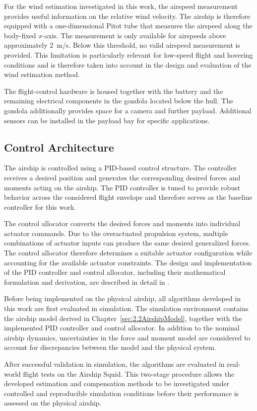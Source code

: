 For the wind estimation investigated in this work, the airspeed measurement provides useful information on the relative wind velocity. The airship is therefore equipped with a one-dimensional Pitot tube that measures the airspeed along the body-fixed $x$-axis. The measurement is only available for airspeeds above approximately \SI{2}{m/s}. Below this threshold, no valid airspeed measurement is provided. This limitation is particularly relevant for low-speed flight and hovering conditions and is therefore taken into account in the design and evaluation of the wind estimation method.

The flight-control hardware is housed together with the battery and the remaining electrical components in the gondola located below the hull. The gondola additionally provides space for a camera and further payload. Additional sensors can be installed in the payload bay for specific applications.





\subsection{Control Architecture}

The airship is controlled using a PID-based control structure. The controller receives a desired position and generates the corresponding desired forces and moments acting on the airship. The PID controller is tuned to provide robust behavior across the considered flight envelope and therefore serves as the baseline controller for this work.

The control allocator converts the desired forces and moments into individual actuator commands. Due to the overactuated propulsion system, multiple combinations of actuator inputs can produce the same desired generalized forces. The control allocator therefore determines a suitable actuator configuration while accounting for the available actuator constraints. The design and implementation of the PID controller and control allocator, including their mathematical formulation and derivation, are described in detail in \cite{Ahmed2022Controller}.

Before being implemented on the physical airship, all algorithms developed in this work are first evaluated in simulation. The simulation environment contains the airship model derived in Chapter~\ref{sec:2.2AirshipModel}, together with the implemented PID controller and control allocator. In addition to the nominal airship dynamics, uncertainties in the force and moment model are considered to account for discrepancies between the model and the physical system.

After successful validation in simulation, the algorithms are evaluated in real-world flight tests on the Airship Squid. This two-stage procedure allows the developed estimation and compensation methods to be investigated under controlled and reproducible simulation conditions before their performance is assessed on the physical airship.





